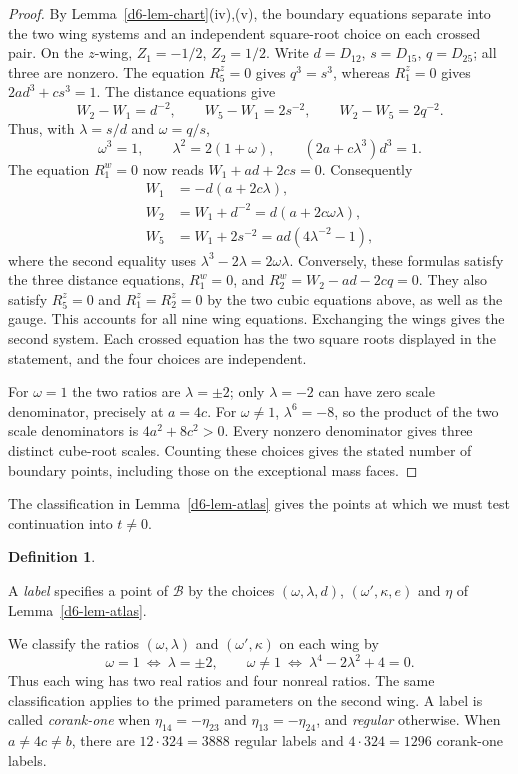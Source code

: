 \documentclass[Threeside,11pt]{article}
\theoremstyle{definition}
\newtheorem{definition}[theorem]{Definition}
\theoremstyle{remark}
\numberwithin{equation}{section}
\theoremstyle{remark}
\begin{document}
{\begin{proof}
By Lemma~\ref{d6-lem-chart}(iv),(v), the boundary equations separate
into the two wing systems and an independent square-root choice on each
crossed pair. On the $z$-wing,
$Z_1=-1/2$, $Z_2=1/2$. Write
$d=D_{12}$, $s=D_{15}$, $q=D_{25}$; all three are nonzero.
The equation $R_5^z=0$ gives $q^3=s^3$, whereas $R_1^z=0$ gives
$2ad^3+cs^3=1$. The distance equations give
\[
W_2-W_1=d^{-2},\qquad W_5-W_1=2s^{-2},\qquad
W_2-W_5=2q^{-2}.
\]
Thus, with $\lambda=s/d$ and $\omega=q/s$,
\[
\omega^3=1,\qquad \lambda^2=2(1+\omega),\qquad
(2a+c\lambda^3)d^3=1.
\]
The equation $R_1^w=0$ now reads $W_1+ad+2cs=0$.
Consequently
\begin{align*}
W_1&=-d(a+2c\lambda),\\
W_2&=W_1+d^{-2}=d(a+2c\omega\lambda),\\
W_5&=W_1+2s^{-2}=ad(4\lambda^{-2}-1),
\end{align*}
where the second equality uses $\lambda^3-2\lambda=2\omega\lambda$.
Conversely, these formulas satisfy the three distance equations,
$R_1^w=0$, and
$R_2^w=W_2-ad-2cq=0$. They also satisfy $R_5^z=0$ and
$R_1^z=R_2^z=0$ by the two cubic equations above, as well as the gauge.
This accounts for all nine wing equations.  Exchanging the wings gives
the second system.  Each crossed equation has the two square roots
displayed in the statement, and the four choices are independent.

For $\omega=1$ the two ratios are $\lambda=\pm2$; only $\lambda=-2$
can have zero scale denominator, precisely at $a=4c$.
For $\omega\ne1$, $\lambda^6=-8$, so the product of the two scale
denominators is $4a^2+8c^2>0$. Every nonzero denominator gives three distinct
cube-root scales.  Counting these choices gives the stated number of
boundary points, including those on the exceptional mass faces.
\end{proof}

}{
The classification in Lemma~\ref{d6-lem-atlas} gives the points at which
we must test continuation into $t\ne0$.
}

\begin{definition}\label{d6-def-labels}
{
A \emph{label} specifies a point of $\mathcal B$ by the choices
$(\omega,\lambda,d)$, $(\omega',\kappa,e)$ and $\eta$ of
Lemma~\ref{d6-lem-atlas}.

We classify the ratios $(\omega,\lambda)$ and $(\omega',\kappa)$ on each wing by
\[
 \omega=1\ \Longleftrightarrow\ \lambda=\pm2,
 \qquad
 \omega\ne1\ \Longleftrightarrow\ \lambda^4-2\lambda^2+4=0.
\]
Thus each wing has two real ratios and four nonreal ratios. The same
classification applies to the primed parameters on the second wing.
A label is called \emph{corank-one} when $\eta_{14}=-\eta_{23}$ and
$\eta_{13}=-\eta_{24}$, and \emph{regular} otherwise.
When $a\ne4c\ne b$, there are $12\cdot324=3888$ regular labels and
$4\cdot324=1296$ corank-one labels.
}
\end{definition}
\end{document}
